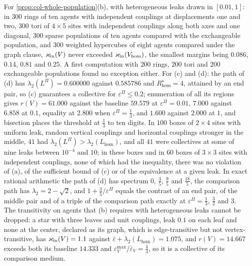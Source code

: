 \begin{numcheck}\label{chk:col-whole-population}
For \cref{prop:col-whole-population}(b), with heterogeneous leaks drawn in $[0.01,1]$: in $300$ rings of ten agents with independent couplings at displacements one and two, $300$ tori of $4\times5$ sites with independent couplings along both axes and one diagonal, $300$ sparse populations of ten agents compared with the exchangeable population, and $300$ weighted hypercubes of eight agents compared under the graph clause, $\varkappa_{\mathrm{in}}(V)$ never exceeded $\varkappa_{\mathrm{in}}(V_{\mathrm{hom}})$, the smallest margins being $0.086$, $0.14$, $0.81$ and $0.25$. A first computation with $200$ rings, $200$ tori and $200$ exchangeable populations found no exception either. For (c) and (d): the path of (d) has $\lambda_2(L^\Pi)=0.600000$ against $0.585786$ and $R^\star_{\mathrm{hom}}=4$, attained by an end pair, so (c) guarantees a collective for $\varepsilon^\Pi\le0.2$; enumeration of all its regions gives $r(V)=61.000$ against the baseline $59.579$ at $\varepsilon^\Pi=0.01$, $7.000$ against $6.858$ at $0.1$, equality at $2.800$ when $\varepsilon^\Pi=\frac13$, and $1.600$ against $2.000$ at $1$, and bisection places the threshold at $\frac13$ to ten digits. In $100$ boxes of $2\times4$ sites with uniform leak, random vertical couplings and horizontal couplings stronger in the middle, $41$ had $\lambda_2(L^\Pi)>\lambda_2(L_{\mathrm{hom}})$, and all $41$ were collectives at some of nine leaks between $10^{-4}$ and $10$; in these boxes and in $60$ boxes of $3\times3$ sites with independent couplings, none of which had the inequality, there was no violation of (a), of the sufficient bound of (c) or of the equivalence at a given leak. In exact rational arithmetic the path of (d) has spectrum $0$, $\frac35$, $\frac95$ and $\frac{18}5$, the comparison path has $\lambda_2=2-\sqrt2$, and $1+\frac35/\varepsilon^\Pi$ equals the contrast of an end pair, of the middle pair and of a triple of the comparison path exactly at $\varepsilon^\Pi=\frac13$, $\frac32$ and $3$. The transitivity on agents that (b) requires with heterogeneous leaks cannot be dropped: a star with three leaves and unit couplings, leak $0.1$ on each leaf and none at the center, declared as its graph, which is edge-transitive but not vertex-transitive, has $\varkappa_{\mathrm{in}}(V)=1.1$ against $\bar\varepsilon+\lambda_2(L_{\mathrm{hom}})=1.075$, and $r(V)=14.667$ exceeds both its baseline $14.333$ and $\varepsilon^{\max}_V/\bar\varepsilon_V=\frac43$, so it is a collective of its comparison medium.
\end{numcheck}

